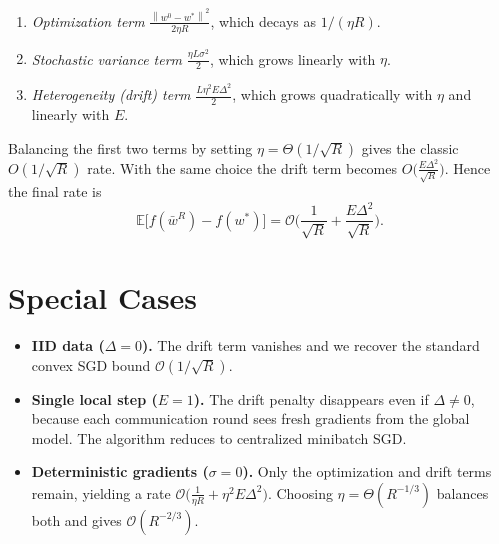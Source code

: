 \documentclass{article}
\newcommand{\E}{\mathbb{E}}
\newcommand{\norm}[1]{\left\lVert#1\right\rVert}
\begin{document}
\begin{enumerate}
\item \emph{Optimization term} $\frac{\norm{w^{0}-w^{*}}^{2}}{2\eta R}$,
which decays as $1/(\eta R)$.
\item \emph{Stochastic variance term} $\frac{\eta L\sigma^{2}}{2}$,
which grows linearly with $\eta$.
\item \emph{Heterogeneity (drift) term}
$\frac{L\eta^{2}E\Delta^{2}}{2}$,
which grows quadratically with $\eta$ and linearly with $E$.
\end{enumerate}
Balancing the first two terms by setting $\eta=\Theta(1/\sqrt{R})$
gives the classic $O(1/\sqrt{R})$ rate.  With the same choice the drift
term becomes $O\!\big(\frac{E\Delta^{2}}{\sqrt{R}}\big)$.  Hence the final
rate is
\[
\E\!\big[f(\bar w^{R})-f(w^{*})\big]
= \mathcal O\!\Big(\frac{1}{\sqrt{R}}+\frac{E\Delta^{2}}{\sqrt{R}}\Big).
\]

\section*{Special Cases}
\begin{itemize}
\item \textbf{IID data ($\Delta=0$).}  The drift term vanishes and we
recover the standard convex SGD bound
$\mathcal O(1/\sqrt{R})$.
\item \textbf{Single local step ($E=1$).}  The drift penalty disappears even
if $\Delta\neq0$, because each communication round sees fresh gradients
from the global model.  The algorithm reduces to centralized minibatch
SGD.
\item \textbf{Deterministic gradients ($\sigma=0$).}  Only the optimization
and drift terms remain, yielding a rate $\mathcal O\!\big(\frac{1}{\eta R}
+ \eta^{2}E\Delta^{2}\big)$.  Choosing $\eta=\Theta(R^{-1/3})$ balances
both and gives $\mathcal O(R^{-2/3})$.
\end{itemize}
\end{document}
